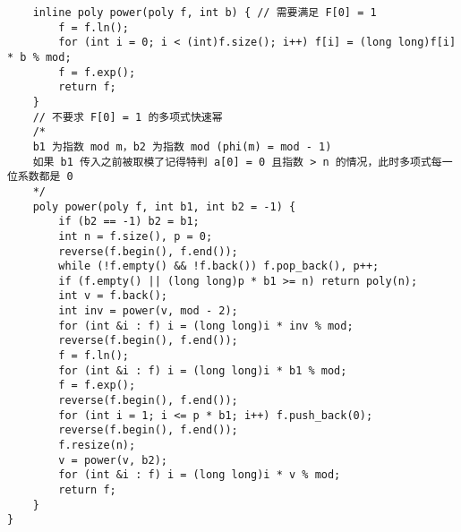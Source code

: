 \begin{verbatim}
    inline poly power(poly f, int b) { // 需要满足 F[0] = 1
        f = f.ln();
        for (int i = 0; i < (int)f.size(); i++) f[i] = (long long)f[i] * b % mod;
        f = f.exp();
        return f;
    }
    // 不要求 F[0] = 1 的多项式快速幂
    /*
    b1 为指数 mod m，b2 为指数 mod (phi(m) = mod - 1)
    如果 b1 传入之前被取模了记得特判 a[0] = 0 且指数 > n 的情况，此时多项式每一位系数都是 0
    */
    poly power(poly f, int b1, int b2 = -1) {
        if (b2 == -1) b2 = b1;
        int n = f.size(), p = 0;
        reverse(f.begin(), f.end());
        while (!f.empty() && !f.back()) f.pop_back(), p++;
        if (f.empty() || (long long)p * b1 >= n) return poly(n);
        int v = f.back();
        int inv = power(v, mod - 2);
        for (int &i : f) i = (long long)i * inv % mod;
        reverse(f.begin(), f.end());
        f = f.ln();
        for (int &i : f) i = (long long)i * b1 % mod;
        f = f.exp();
        reverse(f.begin(), f.end());
        for (int i = 1; i <= p * b1; i++) f.push_back(0);
        reverse(f.begin(), f.end());
        f.resize(n);
        v = power(v, b2);
        for (int &i : f) i = (long long)i * v % mod;
        return f;
    }
}
\end{verbatim}